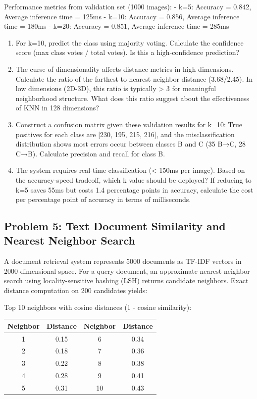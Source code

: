 \documentclass[12pt]{article}
\begin{document}
Performance metrics from validation set (1000 images):
- k=5: Accuracy = 0.842, Average inference time = 125ms
- k=10: Accuracy = 0.856, Average inference time = 180ms
- k=20: Accuracy = 0.851, Average inference time = 285ms

\begin{enumerate}[label=(\alph*)]
\item For k=10, predict the class using majority voting. Calculate the confidence score (max class votes / total votes). Is this a high-confidence prediction?

\item The curse of dimensionality affects distance metrics in high dimensions. Calculate the ratio of the farthest to nearest neighbor distance (3.68/2.45). In low dimensions (2D-3D), this ratio is typically > 3 for meaningful neighborhood structure. What does this ratio suggest about the effectiveness of KNN in 128 dimensions?

\item Construct a confusion matrix given these validation results for k=10: True positives for each class are [230, 195, 215, 216], and the misclassification distribution shows most errors occur between classes B and C (35 B→C, 28 C→B). Calculate precision and recall for class B.

\item The system requires real-time classification (< 150ms per image). Based on the accuracy-speed tradeoff, which k value should be deployed? If reducing to k=5 saves 55ms but costs 1.4 percentage points in accuracy, calculate the cost per percentage point of accuracy in terms of milliseconds.
\end{enumerate}

\subsection*{Problem 5: Text Document Similarity and Nearest Neighbor Search}

A document retrieval system represents 5000 documents as TF-IDF vectors in 2000-dimensional space. For a query document, an approximate nearest neighbor search using locality-sensitive hashing (LSH) returns candidate neighbors. Exact distance computation on 200 candidates yields:

Top 10 neighbors with cosine distances (1 - cosine similarity):
\begin{center}
\begin{tabular}{cc|cc}
\toprule
Neighbor & Distance & Neighbor & Distance \\
\midrule
1 & 0.15 & 6 & 0.34 \\
2 & 0.18 & 7 & 0.36 \\
3 & 0.22 & 8 & 0.38 \\
4 & 0.28 & 9 & 0.41 \\
5 & 0.31 & 10 & 0.43 \\
\bottomrule
\end{tabular}
\end{center}
\end{document}
